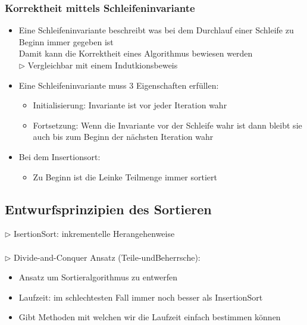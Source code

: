 			\subsubsection{Korrektheit mittels Schleifeninvariante}
				\begin{itemize}
					\item Eine Schleifeninvariante beschreibt was bei dem Durchlauf einer Schleife zu Beginn immer gegeben ist \\
						Damit kann die Korrektheit eines Algorithmus bewiesen werden \\
						$\rhd$ Vergleichbar mit einem Indutkionsbeweis 
					\item Eine Schleifeninvariante muss 3 Eigenschaften erfüllen:
					\begin{itemize}
						\item Initialisierung: Invariante ist vor jeder Iteration wahr
						\item Fortsetzung: Wenn die Invariante vor der Schleife wahr ist dann bleibt sie auch bis zum Beginn der nächsten Iteration wahr
					\end{itemize}
					\item Bei dem Insertionsort:
					\begin{itemize}
						\item Zu Beginn ist die Leinke Teilmenge immer sortiert
					\end{itemize}
				\end{itemize}
				\vspace{1.5cm}
		
		
	\subsection{Entwurfsprinzipien des Sortieren}
	
		$\rhd$ IsertionSort: inkrementelle Herangehenweise \\ \\
		
		\noindent $\rhd$ Divide-and-Conquer Ansatz (Teile-undBeherrsche):
		\begin{itemize}
			\item Ansatz um Sortieralgorithmus zu entwerfen
			\item Laufzeit: im schlechtesten Fall immer noch besser als InsertionSort
			\item Gibt Methoden mit welchen wir die Laufzeit einfach bestimmen können \\
		\end{itemize}
		
